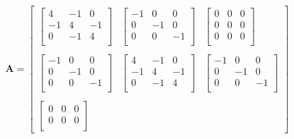 \documentclass[12pt]{article}
\begin{document}
    \[
        \mathbf{A} = 
        \begin{bmatrix}
            \begin{bmatrix}
                4  & -1 & 0 \\
                -1 & 4  & -1\\
                0  & -1 & 4 \\
            \end{bmatrix}
            &
            \begin{bmatrix}
                -1 & 0  & 0 \\
                0  & -1 & 0 \\
                0  & 0  & -1\\
            \end{bmatrix}
            &
            \begin{bmatrix}
                0 & 0 & 0 \\
                0 & 0 & 0 \\
                0 & 0 & 0\\
            \end{bmatrix}
            \\
            \\
            \begin{bmatrix}
                -1 & 0  & 0 \\
                0  & -1 & 0 \\
                0  & 0  & -1\\
            \end{bmatrix}
            &
            \begin{bmatrix}
                4  & -1 & 0 \\
                -1 & 4  & -1\\
                0  & -1 & 4 \\
            \end{bmatrix}
            &
            \begin{bmatrix}
                -1 & 0  & 0 \\
                0  & -1 & 0 \\
                0  & 0  & -1\\
            \end{bmatrix}
            \\
            \\
            \begin{bmatrix}
                0 & 0 & 0 \\
                0 & 0 & 0 \\

\end{bmatrix}
\end{bmatrix}\]
\end{document}
